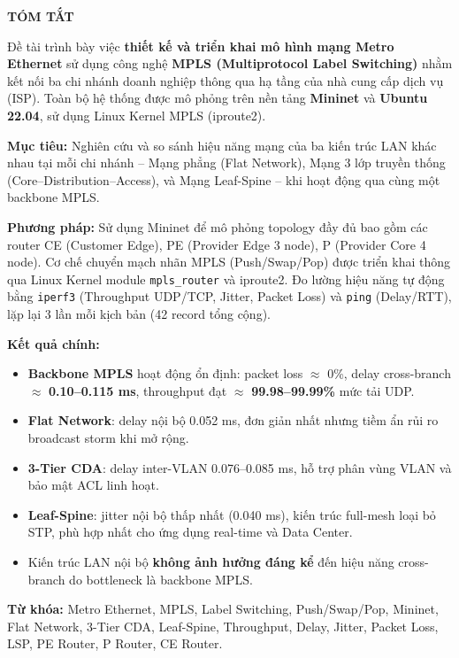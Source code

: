 \begin{center}
    {\large \textbf{TÓM TẮT}}
\end{center}
\vspace{0.3cm}

\noindent Đề tài trình bày việc \textbf{thiết kế và triển khai mô hình mạng Metro Ethernet} sử dụng công nghệ \textbf{MPLS (Multiprotocol Label Switching)} nhằm kết nối ba chi nhánh doanh nghiệp thông qua hạ tầng của nhà cung cấp dịch vụ (ISP). Toàn bộ hệ thống được mô phỏng trên nền tảng \textbf{Mininet} và \textbf{Ubuntu 22.04}, sử dụng Linux Kernel MPLS (iproute2).

\vspace{0.3cm}
\noindent \textbf{Mục tiêu:} Nghiên cứu và so sánh hiệu năng mạng của ba kiến trúc LAN khác nhau tại mỗi chi nhánh -- Mạng phẳng (Flat Network), Mạng 3 lớp truyền thống (Core--Distribution--Access), và Mạng Leaf-Spine -- khi hoạt động qua cùng một backbone MPLS.

\vspace{0.3cm}
\noindent \textbf{Phương pháp:} Sử dụng Mininet để mô phỏng topology đầy đủ bao gồm các router CE (Customer Edge), PE (Provider Edge 3 node), P (Provider Core 4 node). Cơ chế chuyển mạch nhãn MPLS (Push/Swap/Pop) được triển khai thông qua Linux Kernel module \texttt{mpls\_router} và iproute2. Đo lường hiệu năng tự động bằng \texttt{iperf3} (Throughput UDP/TCP, Jitter, Packet Loss) và \texttt{ping} (Delay/RTT), lặp lại 3 lần mỗi kịch bản (42 record tổng cộng).

\vspace{0.3cm}
\noindent \textbf{Kết quả chính:}
\begin{itemize}
    \item \textbf{Backbone MPLS} hoạt động ổn định: packet loss $\approx$ 0\%, delay cross-branch $\approx$ \textbf{0.10--0.115 ms}, throughput đạt $\approx$ \textbf{99.98--99.99\%} mức tải UDP.
    \item \textbf{Flat Network}: delay nội bộ 0.052 ms, đơn giản nhất nhưng tiềm ẩn rủi ro broadcast storm khi mở rộng.
    \item \textbf{3-Tier CDA}: delay inter-VLAN 0.076--0.085 ms, hỗ trợ phân vùng VLAN và bảo mật ACL linh hoạt.
    \item \textbf{Leaf-Spine}: jitter nội bộ thấp nhất (0.040 ms), kiến trúc full-mesh loại bỏ STP, phù hợp nhất cho ứng dụng real-time và Data Center.
    \item Kiến trúc LAN nội bộ \textbf{không ảnh hưởng đáng kể} đến hiệu năng cross-branch do bottleneck là backbone MPLS.
\end{itemize}

\vspace{0.3cm}
\noindent \textbf{Từ khóa:} Metro Ethernet, MPLS, Label Switching, Push/Swap/Pop, Mininet, Flat Network, 3-Tier CDA, Leaf-Spine, Throughput, Delay, Jitter, Packet Loss, LSP, PE Router, P Router, CE Router.